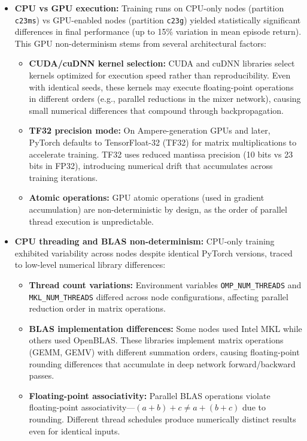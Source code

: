 \begin{itemize}
    \item \textbf{CPU vs GPU execution:} Training runs on CPU-only nodes (partition \texttt{c23ms}) vs GPU-enabled nodes (partition \texttt{c23g}) yielded statistically significant differences in final performance (up to 15\% variation in mean episode return). This GPU non-determinism stems from several architectural factors:
    \begin{itemize}
        \item \textbf{CUDA/cuDNN kernel selection:} CUDA and cuDNN libraries select kernels optimized for execution speed rather than reproducibility. Even with identical seeds, these kernels may execute floating-point operations in different orders (e.g., parallel reductions in the mixer network), causing small numerical differences that compound through backpropagation.
        \item \textbf{TF32 precision mode:} On Ampere-generation GPUs and later, PyTorch defaults to TensorFloat-32 (TF32) for matrix multiplications to accelerate training. TF32 uses reduced mantissa precision (10 bits vs 23 bits in FP32), introducing numerical drift that accumulates across training iterations.
        \item \textbf{Atomic operations:} GPU atomic operations (used in gradient accumulation) are non-deterministic by design, as the order of parallel thread execution is unpredictable.
    \end{itemize}
    
    \item \textbf{CPU threading and BLAS non-determinism:} CPU-only training exhibited variability across nodes despite identical PyTorch versions, traced to low-level numerical library differences:
    \begin{itemize}
        \item \textbf{Thread count variations:} Environment variables \texttt{OMP\_NUM\_THREADS} and \texttt{MKL\_NUM\_THREADS} differed across node configurations, affecting parallel reduction order in matrix operations.
        \item \textbf{BLAS implementation differences:} Some nodes used Intel MKL while others used OpenBLAS. These libraries implement matrix operations (GEMM, GEMV) with different summation orders, causing floating-point rounding differences that accumulate in deep network forward/backward passes.
        \item \textbf{Floating-point associativity:} Parallel BLAS operations violate floating-point associativity—$(a + b) + c \neq a + (b + c)$ due to rounding. Different thread schedules produce numerically distinct results even for identical inputs.
    \end{itemize}
    

\end{itemize}
